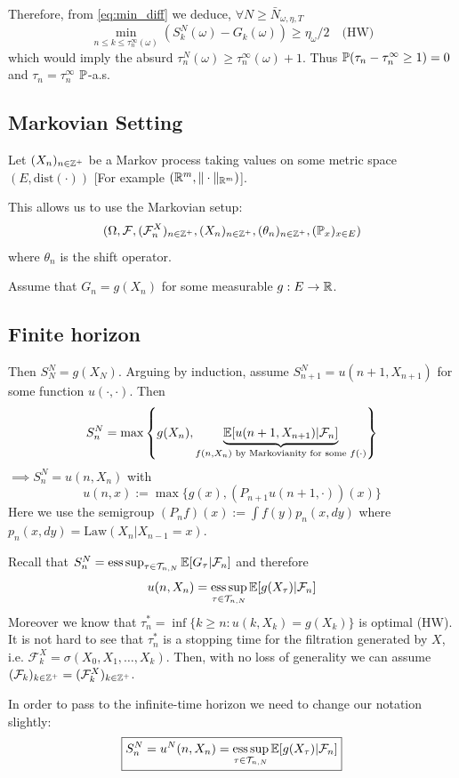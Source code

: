 \begin{remark}
    Therefore, from \eqref{eq:min_diff} we deduce, $\forall N \ge \bar{N}_{\omega, \eta, T}$
    $$\min_{n \le k \le \tau_n^\infty(\omega)} (S_k^N(\omega) - G_k(\omega)) \ge \eta_\omega / 2 \quad \text{(HW)}$$
    which would imply the absurd $\tau_n^N(\omega) \ge \tau_n^\infty(\omega) + 1$.
    Thus $\mathbb P(\tau_n - \tau_n^\infty \ge 1) = 0$ and $\tau_n = \tau_n^\infty$ $\mathbb P$-a.s.
\end{remark}

\subsection{Markovian Setting}

Let $(X_n)_{n \in \mathbb Z^+}$ be a Markov process taking values on some metric space $(E, \text{dist}(\cdot))$ [For example $(\mathbb R^m, \|\cdot\|_{\mathbb R^m})$].

This allows us to use the Markovian setup:
$$(\Omega, \mathcal{F}, (\mathcal{F}_n^X)_{n \in \mathbb Z^+}, (X_n)_{n \in \mathbb Z^+}, (\theta_n)_{n \in \mathbb Z^+}, (\mathbb P_x)_{x \in E})$$
where $\theta_n$ is the shift operator.

Assume that $G_n = g(X_n)$ for some measurable $g: E \to \mathbb R$.

\subsection{Finite horizon}
Then $S_N^N = g(X_N)$. Arguing by induction, assume $S_{n+1}^N = u(n+1, X_{n+1})$ for some function $u(\cdot, \cdot)$.
Then
$$S_n^N = \max \left\{ g(X_n), \underbrace{\mathbb E[u(n+1, X_{n+1}) | \mathcal{F}_n]}_{f(n, X_n) \text{ by Markovianity for some } f(\cdot)} \right\}$$
$\implies S_n^N = u(n, X_n)$ with
$$u(n, x) := \max \{g(x), (P_{n+1} u(n+1, \cdot))(x)\}$$
Here we use the semigroup $(P_n f)(x) := \int f(y) p_n(x, dy)$ where $p_n(x, dy) = \text{Law}(X_n | X_{n-1} = x)$.

Recall that $S_n^N = \operatorname*{ess\,sup}_{\tau \in \mathcal{T}_{n,N}} \mathbb E[G_\tau | \mathcal{F}_n]$ and therefore
$$u(n, X_n) = \operatorname*{ess\,sup}_{\tau \in \mathcal{T}_{n,N}} \mathbb E[g(X_\tau) | \mathcal{F}_n]$$
Moreover we know that $\tau_n^* = \inf \{k \ge n : u(k, X_k) = g(X_k)\}$ is optimal (HW). It is not hard to see that $\tau_n^*$ is a stopping time for the filtration generated by $X$, i.e. $\mathcal{F}_k^X = \sigma(X_0, X_1, \dots, X_k)$. Then, with no loss of generality we can assume $(\mathcal{F}_k)_{k \in \mathbb Z^+} = (\mathcal{F}_k^X)_{k \in \mathbb Z^+}$.

In order to pass to the infinite-time horizon we need to change our notation slightly:
\begin{equation*}
    \boxed{S_n^N = u^N(n, X_n) = \operatorname*{ess\,sup}_{\tau \in \mathcal{T}_{n,N}} \mathbb E[g(X_\tau) | \mathcal{F}_n]}
\end{equation*}

